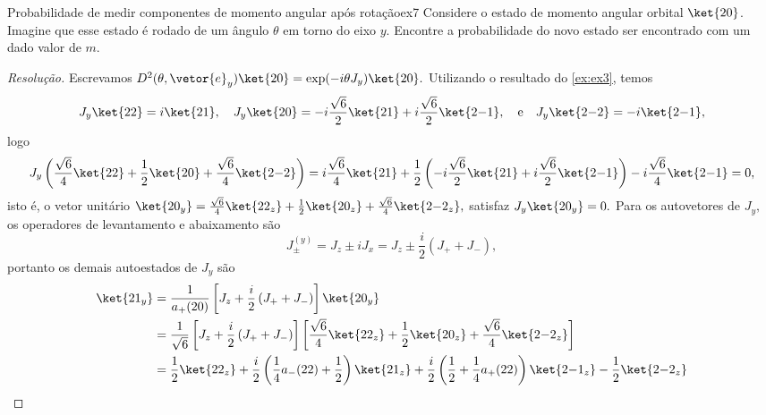 \begin{exercício}{Probabilidade de medir componentes de momento angular após rotação}{ex7}
    Considere o estado de momento angular orbital \(\ket{2 0}\). Imagine que esse estado é rodado de um ângulo \(\theta\) em torno do eixo \(y\). Encontre a probabilidade do novo estado ser encontrado com um dado valor de \(m\).
\end{exercício}
\begin{proof}[Resolução]
    Escrevamos \(D^2(\theta, \vetor{e}_y) \ket{20} = \exp(-i \theta J_y) \ket{20}.\) Utilizando o resultado do \cref{ex:ex3}, temos
    \begin{equation*}
        J_y \ket{22} = i \ket{21},\quad
        J_y \ket{20} = -i\frac{\sqrt{6}}{2} \ket{21} + i \frac{\sqrt{6}}{2} \ket{2{-1}},\quad\text{e}\quad
        J_y \ket{2{-2}} = -i \ket{2{-1}},
    \end{equation*}
    logo
    \begin{equation*}
        J_y \left(\frac{\sqrt{6}}{4}\ket{22} + \frac12 \ket{20} + \frac{\sqrt{6}}{4} \ket{2{-2}}\right) 
        = i\frac{\sqrt{6}}{4} \ket{21} + \frac12 \left(-i \frac{\sqrt{6}}{2} \ket{21} + i \frac{\sqrt{6}}{2} \ket{2 {-1}}\right) - i\frac{\sqrt{6}}{4}\ket{2{-1}}
        = 0,
    \end{equation*}
    isto é, o vetor unitário \(\ket{20_y} = \frac{\sqrt{6}}{4}\ket{22_z} + \frac12 \ket{20_z} + \frac{\sqrt{6}}{4} \ket{2{-2}_z},\) satisfaz \(J_y \ket{20_y} = 0.\) Para os autovetores de \(J_y,\) os operadores de levantamento e abaixamento são 
    \begin{equation*}
        J^{(y)}_{\pm} = J_z \pm i J_x = J_z \pm \frac{i}{2} \left(J_+ + J_-\right),
    \end{equation*}
    portanto os demais autoestados de \(J_y\) são
    \begin{align*}
        \ket{21_y} &= \frac{1}{a_+(20)}\left[J_z + \frac{i}{2} \left(J_+ + J_-\right)\right]\ket{20_y}\\
                   &= \frac{1}{\sqrt{6}}\left[J_z + \frac{i}{2} \left(J_+ + J_-\right)\right]\left[\frac{\sqrt{6}}{4}\ket{22_z} + \frac12 \ket{20_z} + \frac{\sqrt{6}}{4} \ket{2{-2}_z}\right]\\
                   &= \frac{1}{2}\ket{22_z} + \frac{i}{2}\left(\frac{1}{4} a_-(22) + \frac12 \right)\ket{21_z} + \frac{i}{2}\left(\frac12 + \frac{1}{4} a_+(22)\right)\ket{2{-1}_z} - \frac{1}{2}\ket{2{-2}_z}\\

\end{align*}
\end{proof}
